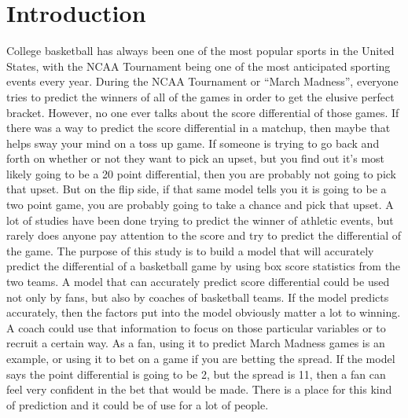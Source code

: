 \documentclass{article}
\begin{document}
\section{Introduction}
College basketball has always been one of the most popular sports in the United States, with the NCAA Tournament being one of the most anticipated sporting events every year. During the NCAA Tournament or “March Madness”, everyone tries to predict the winners of all of the games in order to get the elusive perfect bracket. However, no one ever talks about the score differential of those games. If there was a way to predict the score differential in a matchup, then maybe that helps sway your mind on a toss up game. If someone is trying to go back and forth on whether or not they want to pick an upset, but you find out it's most likely going to be a 20 point differential, then you are probably not going to pick that upset. But on the flip side, if that same model tells you it is going to be a two point game, you are probably going to take a chance and pick that upset. 
\newline \indent A lot of studies have been done trying to predict the winner of athletic events, but rarely does anyone pay attention to the score and try to predict the differential of the game. The purpose of this study is to build a model that will accurately predict the differential of a basketball game by using box score statistics from the two teams. A model that can accurately predict score differential could be used not only by fans, but also by coaches of basketball teams. If the model predicts accurately, then the factors put into the model obviously matter a lot to winning. A coach could use that information to focus on those particular variables or to recruit a certain way. As a fan, using it to predict March Madness games is an example, or using it to bet on a game if you are betting the spread. If the model says the point differential is going to be 2, but the spread is 11, then a fan can feel very confident in the bet that would be made. There is a place for this kind of prediction and it could be of use for a lot of people.
\end{document}
